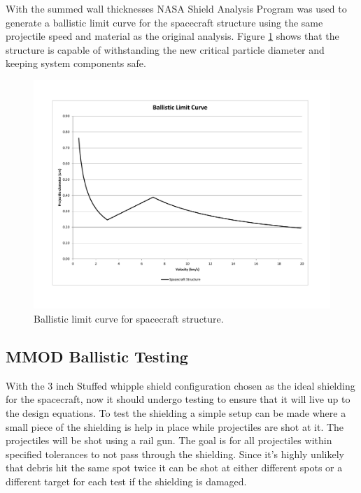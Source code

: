 \documentclass[paper=letter, fontsize=11pt]{scrartcl} %
\numberwithin{equation}{section} %
\numberwithin{figure}{section} %
\numberwithin{table}{section} %
\begin{document}
With the summed wall thicknesses NASA Shield Analysis Program was used to generate a ballistic limit curve for the spacecraft structure using the same projectile speed and material as the original analysis. Figure \ref{fig:MMODstructure} shows that the structure is capable of withstanding the new critical particle diameter and keeping system components safe.

\begin{figure}[H]
    \begin{center}
        \includegraphics[width=5in]{MMODstructure.pdf}
        \caption{Ballistic limit curve for spacecraft structure.}
        \label{fig:MMODstructure}
    \end{center}
\end{figure}

\subsection{MMOD Ballistic Testing}
With the 3 inch Stuffed whipple shield configuration chosen as the ideal shielding for the spacecraft, now it should undergo testing to ensure that it will live up to the design equations. To test the shielding a simple setup can be made where a small piece of the shielding is help in place while projectiles are shot at it. The projectiles will be shot using a rail gun. The goal is for all projectiles within specified tolerances to not pass through the shielding. Since it's highly unlikely that debris hit the same spot twice it can be shot at either different spots or a different target for each test if the shielding is damaged.
\end{document}
